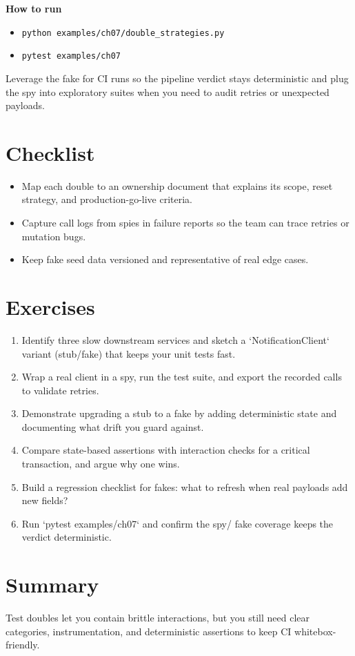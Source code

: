 \textbf{How to run}
\begin{itemize}
  \item \texttt{python examples/ch07/double\_strategies.py}
  \item \texttt{pytest examples/ch07}
\end{itemize}

Leverage the fake for CI runs so the pipeline verdict stays deterministic and plug the spy into exploratory suites when you need to audit retries or unexpected payloads.

\section{Checklist}
\begin{itemize}
  \item Map each double to an ownership document that explains its scope, reset strategy, and production-go-live criteria.
  \item Capture call logs from spies in failure reports so the team can trace retries or mutation bugs.
  \item Keep fake seed data versioned and representative of real edge cases.
\end{itemize}

\section{Exercises}
\begin{enumerate}
  \item Identify three slow downstream services and sketch a `NotificationClient` variant (stub/fake) that keeps your unit tests fast.
  \item Wrap a real client in a spy, run the test suite, and export the recorded calls to validate retries.
  \item Demonstrate upgrading a stub to a fake by adding deterministic state and documenting what drift you guard against.
  \item Compare state-based assertions with interaction checks for a critical transaction, and argue why one wins.
  \item Build a regression checklist for fakes: what to refresh when real payloads add new fields?
  \item Run `pytest examples/ch07` and confirm the spy/ fake coverage keeps the verdict deterministic.
\end{enumerate}

\section{Summary}
Test doubles let you contain brittle interactions, but you still need clear categories, instrumentation, and deterministic assertions to keep CI whitebox-friendly.


